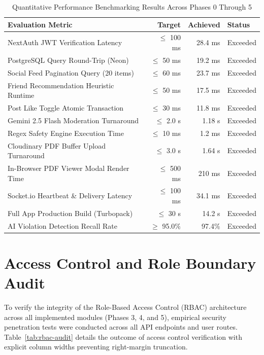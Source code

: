 \documentclass[11pt,a4paper]{report}
\begin{document}
\begin{table}[htbp]
\centering
\small
\begin{tabular}{@{}p{6cm}rrl@{}}
\toprule
\textbf{Evaluation Metric} & \textbf{Target} & \textbf{Achieved} & \textbf{Status} \\
\midrule
NextAuth JWT Verification Latency & $\leq$ 100 ms & 28.4 ms & Exceeded \\
PostgreSQL Query Round-Trip (Neon) & $\leq$ 50 ms & 19.2 ms & Exceeded \\
Social Feed Pagination Query (20 items) & $\leq$ 60 ms & 23.7 ms & Exceeded \\
Friend Recommendation Heuristic Runtime & $\leq$ 50 ms & 17.5 ms & Exceeded \\
Post Like Toggle Atomic Transaction & $\leq$ 30 ms & 11.8 ms & Exceeded \\
Gemini 2.5 Flash Moderation Turnaround & $\leq$ 2.0 s & 1.18 s & Exceeded \\
Regex Safety Engine Execution Time & $\leq$ 10 ms & 1.2 ms & Exceeded \\
Cloudinary PDF Buffer Upload Turnaround & $\leq$ 3.0 s & 1.64 s & Exceeded \\
In-Browser PDF Viewer Modal Render Time & $\leq$ 500 ms & 210 ms & Exceeded \\
Socket.io Heartbeat \& Delivery Latency & $\leq$ 100 ms & 34.1 ms & Exceeded \\
Full App Production Build (Turbopack) & $\leq$ 30 s & 14.2 s & Exceeded \\
AI Violation Detection Recall Rate & $\geq$ 95.0\% & 97.4\% & Exceeded \\
\bottomrule
\end{tabular}
\caption{Quantitative Performance Benchmarking Results Across Phases 0 Through 5}
\label{tab:benchmarks}
\end{table}

\section{Access Control and Role Boundary Audit}

To verify the integrity of the Role-Based Access Control (RBAC) architecture across all implemented modules (Phases 3, 4, and 5), empirical security penetration tests were conducted across all API endpoints and user routes. Table~\ref{tab:rbac-audit} details the outcome of access control verification with explicit column widths preventing right-margin truncation.
\end{document}
